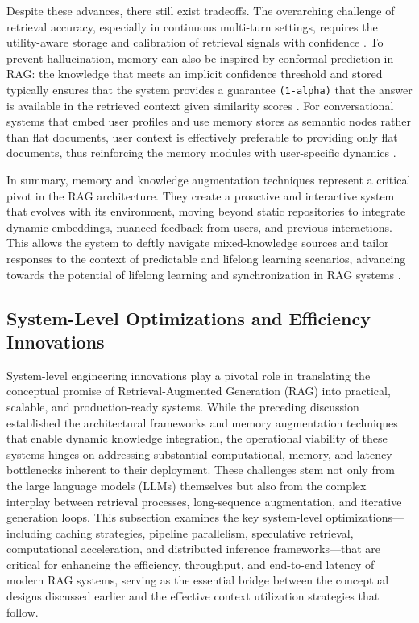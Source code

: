 \documentclass[11pt]{article}
\begin{document}
Despite these advances, there still exist tradeoffs. The overarching challenge of retrieval accuracy, especially in continuous multi-turn settings, requires the utility-aware storage and calibration of retrieval signals with confidence \cite{ref53}. To prevent hallucination, memory can also be inspired by conformal prediction in RAG: the knowledge that meets an implicit confidence threshold and stored typically ensures that the system provides a guarantee \texttt{(1-alpha)} that the answer is available in the retrieved context given similarity scores \cite{ref47}. For conversational systems that embed user profiles and use memory stores as semantic nodes rather than flat documents, user context is effectively preferable to providing only flat documents, thus reinforcing the memory modules with user-specific dynamics \cite{ref56}.

In summary, memory and knowledge augmentation techniques represent a critical pivot in the RAG architecture. They create a proactive and interactive system that evolves with its environment, moving beyond static repositories to integrate dynamic embeddings, nuanced feedback from users, and previous interactions. This allows the system to deftly navigate mixed-knowledge sources and tailor responses to the context of predictable and lifelong learning scenarios, advancing towards the potential of lifelong learning and synchronization in RAG systems \cite{ref1}.

\subsection{System-Level Optimizations and Efficiency Innovations}

System-level engineering innovations play a pivotal role in translating the conceptual promise of Retrieval-Augmented Generation (RAG) into practical, scalable, and production-ready systems. While the preceding discussion established the architectural frameworks and memory augmentation techniques that enable dynamic knowledge integration, the operational viability of these systems hinges on addressing substantial computational, memory, and latency bottlenecks inherent to their deployment. These challenges stem not only from the large language models (LLMs) themselves but also from the complex interplay between retrieval processes, long-sequence augmentation, and iterative generation loops. This subsection examines the key system-level optimizations---including caching strategies, pipeline parallelism, speculative retrieval, computational acceleration, and distributed inference frameworks---that are critical for enhancing the efficiency, throughput, and end-to-end latency of modern RAG systems, serving as the essential bridge between the conceptual designs discussed earlier and the effective context utilization strategies that follow.
\end{document}
